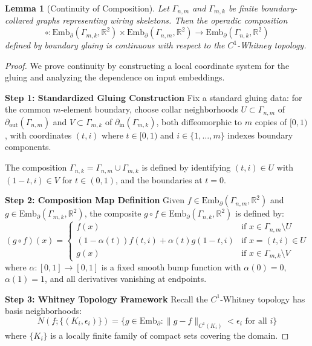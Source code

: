 \documentclass[11pt]{article}
\newtheorem{lemma}{Lemma}
\begin{document}
\begin{lemma}[Continuity of Composition]\label{lem:composition-continuity}
Let $\Gamma_{n,m}$ and $\Gamma_{m,k}$ be finite boundary-collared graphs representing wiring skeletons.
Then the operadic composition
\[
    \circ : \mathrm{Emb}_\partial(\Gamma_{m,k}, \mathbb{R}^2) \times
            \mathrm{Emb}_\partial(\Gamma_{n,m}, \mathbb{R}^2)
            \longrightarrow 
            \mathrm{Emb}_\partial(\Gamma_{n,k}, \mathbb{R}^2)
\]
defined by boundary gluing is continuous with respect to the $C^1$-Whitney topology.
\end{lemma}

\begin{proof}
We prove continuity by constructing a local coordinate system for the gluing and analyzing the dependence on input embeddings.

\noindent\textbf{Step 1: Standardized Gluing Construction}
Fix a standard gluing data: for the common $m$-element boundary, choose collar neighborhoods $U \subset \Gamma_{n,m}$ of $\partial_{\mathrm{out}}(\Gamma_{n,m})$ and $V \subset \Gamma_{m,k}$ of $\partial_{\mathrm{in}}(\Gamma_{m,k})$, both diffeomorphic to $m$ copies of $[0,1)$, with coordinates $(t,i)$ where $t \in [0,1)$ and $i \in \{1,\dots,m\}$ indexes boundary components.

The composition $\Gamma_{n,k} = \Gamma_{n,m} \cup \Gamma_{m,k}$ is defined by identifying $(t,i) \in U$ with $(1-t,i) \in V$ for $t \in (0,1)$, and the boundaries at $t=0$.

\noindent\textbf{Step 2: Composition Map Definition}
Given $f \in \mathrm{Emb}_\partial(\Gamma_{n,m}, \mathbb{R}^2)$ and $g \in \mathrm{Emb}_\partial(\Gamma_{m,k}, \mathbb{R}^2)$, the composite $g \circ f \in \mathrm{Emb}_\partial(\Gamma_{n,k}, \mathbb{R}^2)$ is defined by:
\[
(g \circ f)(x) = 
\begin{cases}
f(x) & \text{if } x \in \Gamma_{n,m} \setminus U \\
(1-\alpha(t))f(t,i) + \alpha(t)g(1-t,i) & \text{if } x = (t,i) \in U \\
g(x) & \text{if } x \in \Gamma_{m,k} \setminus V
\end{cases}
\]
where $\alpha: [0,1] \to [0,1]$ is a fixed smooth bump function with $\alpha(0)=0$, $\alpha(1)=1$, and all derivatives vanishing at endpoints.

\noindent\textbf{Step 3: Whitney Topology Framework}
Recall the $C^1$-Whitney topology has basis neighborhoods:
\[
N(f; \{(K_i, \epsilon_i)\}) = \{g \in \mathrm{Emb}_\partial : \|g - f\|_{C^1(K_i)} < \epsilon_i \text{ for all } i\}
\]
where $\{K_i\}$ is a locally finite family of compact sets covering the domain.


\end{proof}
\end{document}
